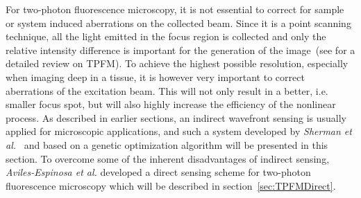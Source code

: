 For two-photon fluorescence microscopy, it is not essential to correct for sample or system induced aberrations on the collected beam. Since it is a point scanning technique, all the light emitted in the focus region is collected and only the relative intensity difference is important for the generation of the image~(see \cite{scan_TPFM_review} for a detailed review on TPFM). To achieve the highest possible resolution, especially when imaging deep in a tissue, it is however very important to correct aberrations of the excitation beam. This will not only result in a better, i.e. smaller focus spot, but will also highly increase the efficiency of the nonlinear process. As described in earlier sections, an indirect wavefront sensing is usually applied for microscopic applications, and such a system developed by \emph{Sherman et al.}~\cite{Genetic_MPFM} and based on a genetic optimization algorithm will be presented in this section. To overcome some of the inherent disadvantages of indirect sensing, \emph{Aviles-Espinosa et al.} developed a direct sensing scheme for two-photon fluorescence microscopy which will be described in section~\ref{sec:TPFMDirect}.


